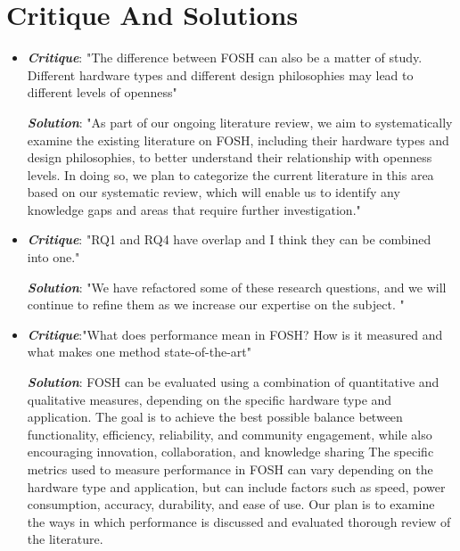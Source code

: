 \documentclass[acmtog]{acmart}
\begin{document}
\section{Critique And Solutions}
\begin{itemize}
\item {\textbf{\itshape Critique}}: "The difference between FOSH can also be a matter of study. Different hardware types and different design philosophies may lead to different levels of openness"
\par{\textbf{\itshape Solution}}: "As part of our ongoing literature review, we aim to systematically examine the existing literature on FOSH, including their hardware types and design philosophies, to better understand their relationship with openness levels. In doing so, we plan to categorize the current literature in this area based on our systematic review, which will enable us to identify any knowledge gaps and areas that require further investigation."
\item {\textbf{\itshape Critique}}: "RQ1 and RQ4 have overlap and I think they can be combined into one."
\par{\textbf{\itshape Solution}}: "We have refactored some of these research questions, and we will continue to refine them as we increase our expertise on the subject. "
\item {\textbf{\itshape Critique}}:"What does performance mean in FOSH? How is it measured and what makes one method state-of-the-art"
\par{\textbf{\itshape Solution}}: 
FOSH can be evaluated using a combination of quantitative and qualitative measures, depending on the specific hardware type and application. The goal is to achieve the best possible balance between functionality, efficiency, reliability, and community engagement, while also encouraging innovation, collaboration, and knowledge sharing
The specific metrics used to measure performance in FOSH can vary depending on the hardware type and application, but can include factors such as speed, power consumption, accuracy, durability, and ease of use. Our plan is to examine the ways in which performance is discussed and evaluated thorough review of the literature.


\end{itemize}
\end{document}

